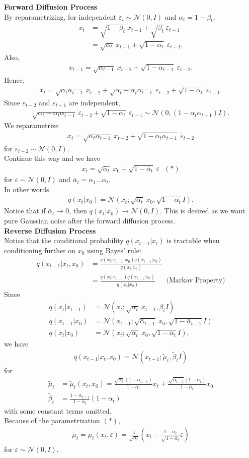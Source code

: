 \documentclass[12pt,oneside]{article}
\newcommand{\e}[0]{\varepsilon}
\newcommand{\ra}[0]{\rightarrow}
\newcommand{\CN}[0]{\mathcal{N}}
\newcommand{\ali}[1]{\begin{align*}#1\end{align*}}
\theoremstyle{plain}
\theoremstyle{remark}
\begin{document}
{\bf Forward Diffusion Process}\\

By reparametrizing, for independent $\e_i \sim \CN(0, I)$ and $\alpha_t = 1 - \beta_t$,
\ali{x_t &= \sqrt{1-\beta_t} \ x_{t-1} + \sqrt{\beta_t} \ \e_{t-1} \\
         &= \sqrt{\alpha_t} \ x_{t-1} + \sqrt{1-\alpha_t} \ \e_{t-1}.}
Also,
\ali{x_{t-1} = \sqrt{\alpha_{t-1}} \ x_{t-2} + \sqrt{1-\alpha_{t-1}} \ \e_{t-2}.}
Hence,
\ali{x_t = \sqrt{\alpha_t \alpha_{t-1}} \ x_{t-2} + \sqrt{\alpha_t - \alpha_t \alpha_{t-1}} \ \e_{t-2} + \sqrt{1-\alpha_t} \ \e_{t-1}.}
Since $\e_{t-2}$ and $\e_{t-1}$ are independent, 
\ali{\sqrt{\alpha_t - \alpha_t \alpha_{t-1}} \ \e_{t-2} + \sqrt{1-\alpha_t} \ \e_{t-1} \sim \CN(0, (1-\alpha_t \alpha_{t-1}) I).}
We reparametrize
\ali{x_t = \sqrt{\alpha_t \alpha_{t-1}} \ x_{t-2} + \sqrt{1-\alpha_t \alpha_{t-1}} \ \tilde{\e}_{t-2}}
for $\tilde{\e}_{t-2} \sim \CN(0, I)$.\\
Continue this way and we have
\ali{x_t = \sqrt{\bar{\alpha}_t} \ x_0 + \sqrt{1 - \bar{\alpha}_t} \ \e \ \ \ (*)}
for $\e \sim \CN(0, I)$ and $\bar{\alpha}_t = \alpha_1...\alpha_t$.\\ 
In other words
\ali{q(x_t | x_0) = \CN(x_t; \sqrt{\bar{\alpha}_t} \ x_0, \sqrt{1 - \bar{\alpha}_t} I).}
Notice that if $\bar{\alpha}_t \ra 0$, then $q(x_t | x_0) \ra \CN(0, I)$. This is desired as we want pure Gaussian noise after the forward diffusion process.\\

{\bf Reverse Diffusion Process}\\

Notice that the conditional probability $q(x_{t-1} | x_t)$ is tractable when conditioning further on $x_0$ using Bayes' rule:
\ali{q(x_{t-1} | x_t, x_0) &= \frac{q(x_t | x_{t-1}, x_0) q(x_{t-1} | x_0)}{q(x_t | x_0)} \\
                           &= \frac{q(x_t | x_{t-1}) q(x_{t-1} | x_0)}{q(x_t | x_0)} \ \ \ \ \ \ \ \text{(Markov Property)}}
Since
\ali{q(x_t | x_{t-1}) &= \CN(x_t; \sqrt{\alpha_t} \ x_{t-1}, \beta_t I) \\
    q(x_{t-1} | x_0)  &= \CN(x_{t-1}; \sqrt{\bar{\alpha}_{t-1}} \ x_0, \sqrt{1 - \bar{\alpha}_{t-1}} I) \\
    q(x_t | x_0) &= \CN(x_t; \sqrt{\bar{\alpha}_t} \ x_0, \sqrt{1 - \bar{\alpha}_t} I),}
we have
\ali{q(x_{t-1} | x_t, x_0) = \CN(x_{t-1}; \tilde{\mu}_t, \tilde{\beta}_t I)}
for 
\ali{\tilde{\mu}_t &= \tilde{\mu}_t(x_t, x_0) = \frac{\sqrt{\alpha_t} (1 - \bar{\alpha}_{t-1})}{1 - \bar{\alpha}_t} x_t + \frac{\sqrt{\bar{\alpha}_{t-1}} (1 - \alpha_t)}{1 - \bar{\alpha}_t} x_0  \\
    \tilde{\beta}_t &= \frac{1 - \bar{\alpha}_{t-1}}{1 - \bar{\alpha}_t} (1- \alpha_t)}
with some constant terms omitted.\\
Because of the parametrization $(*)$,
\ali{\tilde{\mu}_t = \tilde{\mu}_t(x_t, \e) = \frac{1}{\sqrt{\alpha_t}} \left(x_t - \frac{1 - \alpha_t}{\sqrt{1 - \bar{\alpha}_t}} \e \right)}
for $\e \sim \CN(0, I)$.\\
\end{document}
